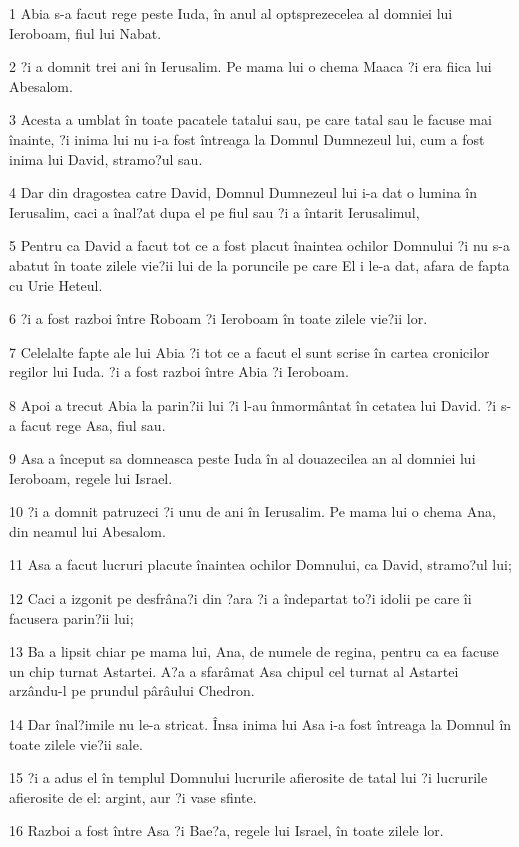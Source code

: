 \par 1 Abia s-a facut rege peste Iuda, în anul al optsprezecelea al domniei lui Ieroboam, fiul lui Nabat.
\par 2 ?i a domnit trei ani în Ierusalim. Pe mama lui o chema Maaca ?i era fiica lui Abesalom.
\par 3 Acesta a umblat în toate pacatele tatalui sau, pe care tatal sau le facuse mai înainte, ?i inima lui nu i-a fost întreaga la Domnul Dumnezeul lui, cum a fost inima lui David, stramo?ul sau.
\par 4 Dar din dragostea catre David, Domnul Dumnezeul lui i-a dat o lumina în Ierusalim, caci a înal?at dupa el pe fiul sau ?i a întarit Ierusalimul,
\par 5 Pentru ca David a facut tot ce a fost placut înaintea ochilor Domnului ?i nu s-a abatut în toate zilele vie?ii lui de la poruncile pe care El i le-a dat, afara de fapta cu Urie Heteul.
\par 6 ?i a fost razboi între Roboam ?i Ieroboam în toate zilele vie?ii lor.
\par 7 Celelalte fapte ale lui Abia ?i tot ce a facut el sunt scrise în cartea cronicilor regilor lui Iuda. ?i a fost razboi între Abia ?i Ieroboam.
\par 8 Apoi a trecut Abia la parin?ii lui ?i l-au înmormântat în cetatea lui David. ?i s-a facut rege Asa, fiul sau.
\par 9 Asa a început sa domneasca peste Iuda în al douazecilea an al domniei lui Ieroboam, regele lui Israel.
\par 10 ?i a domnit patruzeci ?i unu de ani în Ierusalim. Pe mama lui o chema Ana, din neamul lui Abesalom.
\par 11 Asa a facut lucruri placute înaintea ochilor Domnului, ca David, stramo?ul lui;
\par 12 Caci a izgonit pe desfrâna?i din ?ara ?i a îndepartat to?i idolii pe care îi facusera parin?ii lui;
\par 13 Ba a lipsit chiar pe mama lui, Ana, de numele de regina, pentru ca ea facuse un chip turnat Astartei. A?a a sfarâmat Asa chipul cel turnat al Astartei arzându-l pe prundul pârâului Chedron.
\par 14 Dar înal?imile nu le-a stricat. Însa inima lui Asa i-a fost întreaga la Domnul în toate zilele vie?ii sale.
\par 15 ?i a adus el în templul Domnului lucrurile afierosite de tatal lui ?i lucrurile afierosite de el: argint, aur ?i vase sfinte.
\par 16 Razboi a fost între Asa ?i Bae?a, regele lui Israel, în toate zilele lor.
